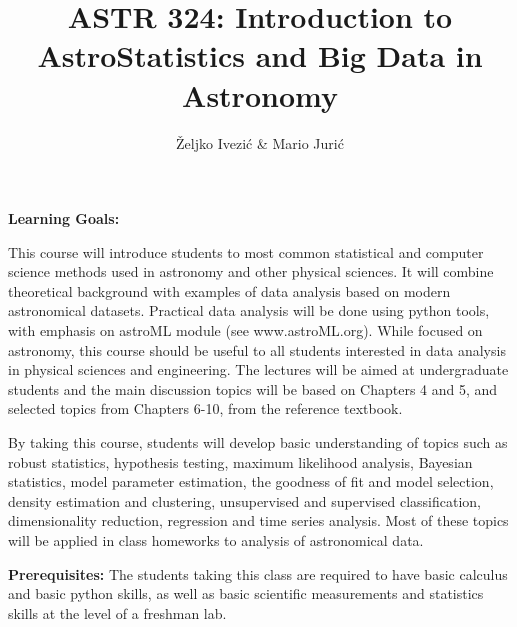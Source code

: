 \documentclass[10pt]{article}
\title{ASTR 324: Introduction to AstroStatistics and Big Data in Astronomy}
\author{\v{Z}eljko Ivezi\'{c}  \& Mario Juri\'{c}}
\affil{University of Washington, Spring Quarter 2018}
\date{\vspace{-5ex}}
\begin{document}
\maketitle

\vskip 0.3in

\vskip 0.2in
\vskip 0.2in
\vskip 0.2in
\vskip 0.2in
\vskip 0.3in

{\bf Learning Goals:}

This course will introduce students to most common statistical and computer science methods 
used in astronomy and other physical sciences. It will combine theoretical background with 
examples of data analysis based on modern astronomical datasets. Practical data analysis 
will be done using python tools, with emphasis on astroML module (see www.astroML.org). 
While focused on astronomy, this course should be useful to all students interested in data 
analysis in physical sciences and engineering. The lectures will be aimed at undergraduate 
students and the main discussion topics will be based on  Chapters 4 and 5, and selected 
topics from Chapters 6-10, from the reference textbook. 

By taking this course, students will develop basic understanding of topics such as robust 
statistics, hypothesis testing, maximum likelihood analysis, Bayesian statistics, model 
parameter estimation, the goodness of fit and model selection, density estimation and 
clustering, unsupervised and supervised classification, dimensionality reduction, 
regression and time series analysis. Most of these topics will be applied in class homeworks 
to analysis of astronomical data. 

{\bf Prerequisites:}
The students taking this class are required to have basic calculus and basic python skills, 
as well as basic scientific measurements and statistics skills at the level of a freshman lab. 
\end{document}

